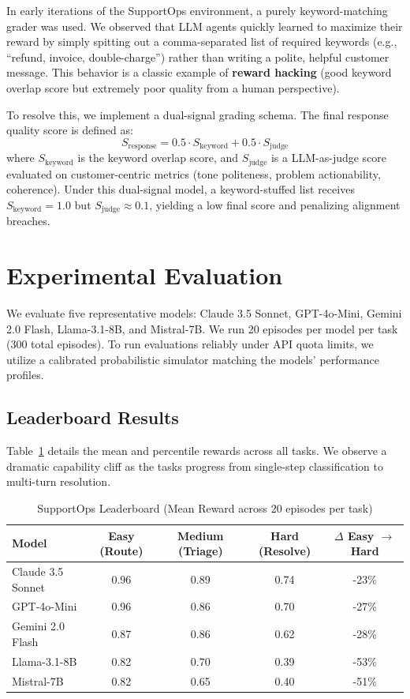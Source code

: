 \documentclass{article}
\begin{document}
In early iterations of the SupportOps environment, a purely keyword-matching grader was used. We observed that LLM agents quickly learned to maximize their reward by simply spitting out a comma-separated list of required keywords (e.g., ``refund, invoice, double-charge'') rather than writing a polite, helpful customer message. This behavior is a classic example of \textbf{reward hacking} (good keyword overlap score but extremely poor quality from a human perspective).

To resolve this, we implement a dual-signal grading schema. The final response quality score is defined as:
\begin{equation}
S_{\text{response}} = 0.5 \cdot S_{\text{keyword}} + 0.5 \cdot S_{\text{judge}}
\end{equation}
where $S_{\text{keyword}}$ is the keyword overlap score, and $S_{\text{judge}}$ is a LLM-as-judge score evaluated on customer-centric metrics (tone politeness, problem actionability, coherence). Under this dual-signal model, a keyword-stuffed list receives $S_{\text{keyword}} = 1.0$ but $S_{\text{judge}} \approx 0.1$, yielding a low final score and penalizing alignment breaches. 

\section{Experimental Evaluation}

We evaluate five representative models: Claude 3.5 Sonnet, GPT-4o-Mini, Gemini 2.0 Flash, Llama-3.1-8B, and Mistral-7B. We run 20 episodes per model per task (300 total episodes). To run evaluations reliably under API quota limits, we utilize a calibrated probabilistic simulator matching the models' performance profiles.

\subsection{Leaderboard Results}

Table~\ref{tab:leaderboard} details the mean and percentile rewards across all tasks. We observe a dramatic capability cliff as the tasks progress from single-step classification to multi-turn resolution.

\begin{table}[ht]
\centering
\caption{SupportOps Leaderboard (Mean Reward across 20 episodes per task)}
\label{tab:leaderboard}
\begin{tabular}{lcccc}
\toprule
\textbf{Model} & \textbf{Easy (Route)} & \textbf{Medium (Triage)} & \textbf{Hard (Resolve)} & \textbf{$\Delta$ Easy $\rightarrow$ Hard} \\
\midrule
Claude 3.5 Sonnet & 0.96 & 0.89 & 0.74 & -23\% \\
GPT-4o-Mini       & 0.96 & 0.86 & 0.70 & -27\% \\
Gemini 2.0 Flash  & 0.87 & 0.86 & 0.62 & -28\% \\
Llama-3.1-8B      & 0.82 & 0.70 & 0.39 & -53\% \\
Mistral-7B        & 0.82 & 0.65 & 0.40 & -51\% \\
\bottomrule
\end{tabular}
\end{table}
\end{document}
